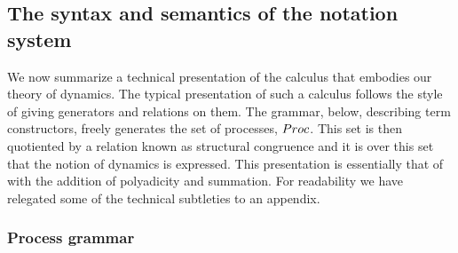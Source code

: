 \documentclass[12pt]{llncs}
\begin{document}
\lstset{language=[Objective]Caml,frame=shadowbox}




 
 

%  


 

    
% 

% 

% 


% 
\subsection{The syntax and semantics of the notation system}\label{sub:the_syntax_and_semantics_of_the_notation_system} %

We now summarize a technical presentation of the calculus that
embodies our theory of dynamics. The typical presentation of such a
calculus follows the style of giving generators and relations on
them. The grammar, below, describing term constructors, freely
generates the set of processes, $\mathbin{Proc}$. This set is then quotiented
by a relation known as structural congruence and it is over this set
that the notion of dynamics is expressed. This presentation is
essentially that of \cite{MeredithR05} with the addition of
polyadicity and summation. For readability we have relegated some of
the technical subtleties to an appendix.

\subsubsection{Process grammar}\label{subsub:process_grammar}

\end{document}
